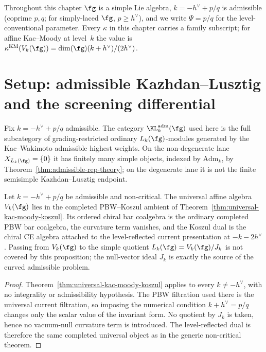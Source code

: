 Throughout this chapter $\fg$ is a simple Lie algebra,
$k = -h^\vee + p/q$ is admissible (coprime $p, q$; for simply-laced
$\fg$, $p \geq h^\vee$), and we write $\Psi = p/q$ for the
level-conventional parameter. Every $\kappa$ in this chapter
carries a family subscript; for affine Kac--Moody at level~$k$
the value is $\kappa^{\mathrm{KM}}(V_k(\fg)) =
\dim(\fg)(k+h^\vee)/(2h^\vee)$.

\section{Setup: admissible Kazhdan--Lusztig and the screening differential}
\label{sec:periodic-cdg-setup}

Fix $k = -h^\vee + p/q$ admissible.  The category
$\KL_k^{\mathrm{adm}}(\fg)$ used here is the full subcategory of
grading-restricted ordinary $L_k(\fg)$-modules generated by the
Kac--Wakimoto admissible highest weights.  On the non-degenerate lane
$X_{L_k(\fg)}=\{0\}$ it has finitely many simple objects, indexed by
$\mathrm{Adm}_k$, by Theorem~\ref{thm:admissible-rep-theory}; on the
degenerate lane it is not the finite semisimple Kazhdan--Lusztig
endpoint.

\begin{proposition}
\label{prop:universal-pbw-koszul-admissible-parameters}
%
Let $k=-h^\vee+p/q$ be admissible and non-critical.  The universal
affine algebra $V_k(\fg)$ lies in the completed PBW--Koszul ambient of
Theorem~\ref{thm:universal-kac-moody-koszul}.  Its ordered chiral bar
coalgebra is the ordinary completed PBW bar coalgebra, the curvature
term vanishes, and the Koszul dual is the chiral CE algebra attached
to the level-reflected current presentation at $-k-2h^\vee$.  Passing
from $V_k(\fg)$ to the simple quotient $L_k(\fg)=V_k(\fg)/J_k$ is not
covered by this proposition; the null-vector ideal $J_k$ is exactly
the source of the curved admissible problem.
\end{proposition}

\begin{proof}
Theorem~\ref{thm:universal-kac-moody-koszul} applies to every
$k\neq -h^\vee$, with no integrality or admissibility hypothesis.
The PBW filtration used there is the universal current filtration,
so imposing the numerical condition $k+h^\vee=p/q$ changes only the
scalar value of the invariant form.  No quotient by $J_k$ is taken,
hence no vacuum-null curvature term is introduced.  The level-reflected
dual is therefore the same completed universal object as in the generic
non-critical theorem.
\end{proof}

